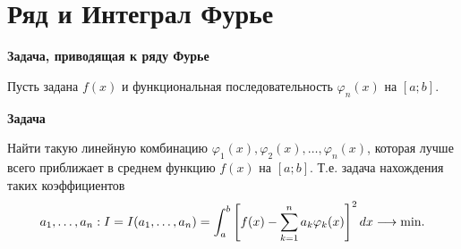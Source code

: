 \section{Ряд и Интеграл Фурье}


\textbf{Задача, приводящая к ряду Фурье}

Пусть задана $f(x)$ и функциональная последовательность ${\varphi_n(x)}$ на $[a ; b]$.

\textbf{Задача}

Найти такую линейную комбинацию $\varphi_1(x), \varphi_2(x),\dots, \varphi_n(x)$, 
которая лучше всего приближает в среднем функцию $f(x)$ на $[a ; b]$. Т.е. задача 
нахождения таких коэффициентов \[ a_1,\dots,a_n : I = I(a_1,\dots,a_n) = \displaystyle\int_a^b \left[ f(x) 
- \displaystyle\sum_{k=1}^n a_k\varphi_k(x)\right] ^2 dx \underset{}{\longrightarrow} \text{min.} \]


